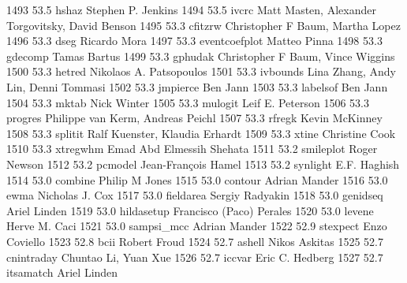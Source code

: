   1493     53.5    hshaz         Stephen P. Jenkins                      
  1494     53.5    ivcrc         Matt Masten, Alexander Torgovitsky,     
                                   David Benson                            
  1495     53.3    cfitzrw       Christopher F Baum, Martha Lopez        
  1496     53.3    dseg          Ricardo Mora                            
  1497     53.3    eventcoefplot  Matteo Pinna                            
  1498     53.3    gdecomp       Tamas Bartus                            
  1499     53.3    gphudak       Christopher F Baum, Vince Wiggins       
  1500     53.3    hetred        Nikolaos A. Patsopoulos                 
  1501     53.3    ivbounds      Lina Zhang, Andy Lin, Denni Tommasi     
  1502     53.3    jmpierce      Ben Jann                                
  1503     53.3    labelsof      Ben Jann                                
  1504     53.3    mktab         Nick Winter                             
  1505     53.3    mulogit       Leif E. Peterson                        
  1506     53.3    progres       Philippe van Kerm, Andreas Peichl       
  1507     53.3    rfregk        Kevin McKinney                          
  1508     53.3    splitit       Ralf Kuenster, Klaudia Erhardt          
  1509     53.3    xtine         Christine Cook                          
  1510     53.3    xtregwhm      Emad Abd Elmessih Shehata               
  1511     53.2    smileplot     Roger Newson                            
  1512     53.2    pcmodel       Jean-François Hamel                    
  1513     53.2    synlight      E.F. Haghish                            
  1514     53.0    combine       Philip M Jones                          
  1515     53.0    contour       Adrian Mander                           
  1516     53.0    ewma          Nicholas J. Cox                         
  1517     53.0    fieldarea     Sergiy Radyakin                         
  1518     53.0    genidseq      Ariel Linden                            
  1519     53.0    hildasetup    Francisco (Paco) Perales                
  1520     53.0    levene        Herve M. Caci                           
  1521     53.0    sampsi_mcc    Adrian Mander                           
  1522     52.9    stexpect      Enzo Coviello                           
  1523     52.8    bcii          Robert Froud                            
  1524     52.7    ashell        Nikos Askitas                           
  1525     52.7    cnintraday    Chuntao Li, Yuan Xue                    
  1526     52.7    iccvar        Eric C. Hedberg                         
  1527     52.7    itsamatch     Ariel Linden                            
